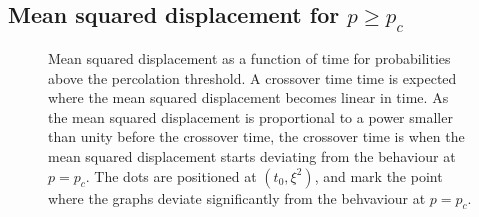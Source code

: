 \documentclass[11pt,british,a4paper]{report}
\begin{document}
\subsection{Mean squared displacement for \(p\geq p_c\)}
\begin{figure}[H]
    \centering
    \caption{Mean squared displacement as a function of time for probabilities above the percolation threshold. A crossover time time is expected where the mean squared displacement becomes linear in time. As the mean squared displacement is proportional to a power smaller than unity before the crossover time, the crossover time is when the mean squared displacement starts deviating from the behaviour at \(p=p_c\). The dots are positioned at \((t_0,\xi^2)\), and mark the point where the graphs deviate significantly from the behvaviour at \(p=p_c\).}%
    \label{fig:r2p}
\end{figure}
\end{document}
